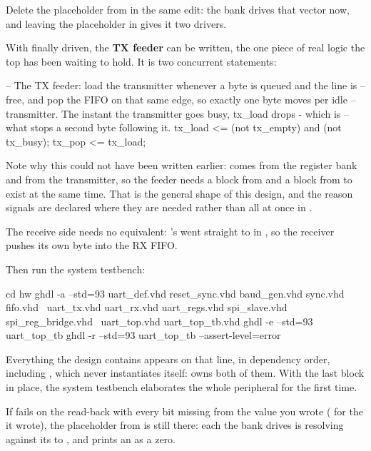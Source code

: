 \noindent Delete the  placeholder from  in the same
edit: the bank drives that vector now, and leaving the placeholder in gives it two drivers.

With  finally driven, the \textbf{TX feeder} can be written, the one piece of real
logic the top has been waiting to hold. It is two concurrent statements:

\begin{vhdlcode}
-- The TX feeder: load the transmitter whenever a byte is queued and the line is
-- free, and pop the FIFO on that same edge, so exactly one byte moves per idle
-- transmitter. The instant the transmitter goes busy, tx_load drops - which is
-- what stops a second byte following it.
tx_load <= (not tx_empty) and (not tx_busy);
tx_pop  <= tx_load;
\end{vhdlcode}

\noindent Note why this could not have been written earlier:  comes from the register
bank and  from the transmitter, so the feeder needs a block from  and a
block from  to exist at the same time. That is the general shape of this design, and the
reason signals are declared where they are needed rather than all at once in .

The receive side needs no equivalent: 's  went straight to 
in , so the receiver pushes its own byte into the RX FIFO.

Then run the system testbench:

\begin{shell}
cd hw
ghdl -a --std=93 uart_def.vhd reset_sync.vhd baud_gen.vhd sync.vhd fifo.vhd \
     uart_tx.vhd uart_rx.vhd uart_regs.vhd spi_slave.vhd spi_reg_bridge.vhd \
     uart_top.vhd uart_top_tb.vhd
ghdl -e --std=93 uart_top_tb
ghdl -r --std=93 uart_top_tb --assert-level=error
\end{shell}

\noindent Everything the design contains appears on that line, in dependency order, including
, which  never instantiates itself:  owns both of them.
With the last block in place, the system testbench elaborates the whole peripheral for the first
time.

If  fails on the  read-back with every  bit missing from the
value you wrote ( for the  it wrote), the placeholder from 
is still there: each \code{'1'} the bank drives is resolving against its \code{'0'} to \code{'X'}, and
\code{to_hex} prints an \code{'X'} as a zero.

